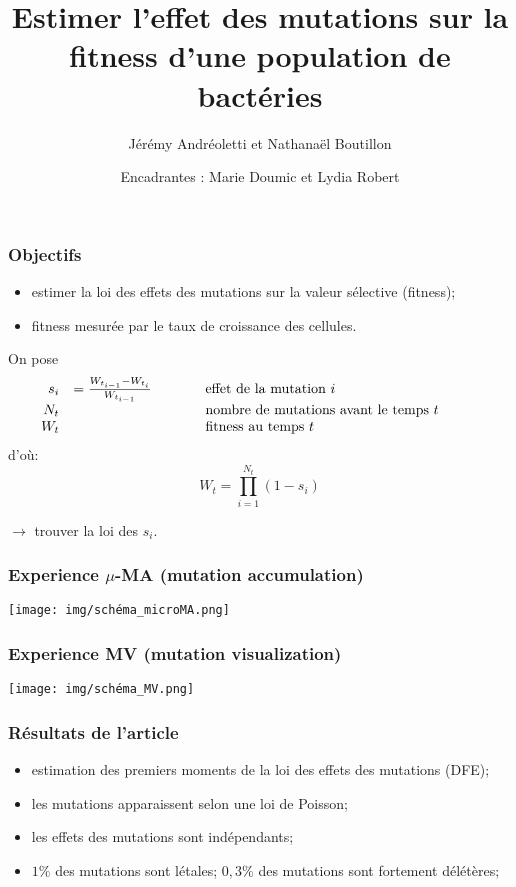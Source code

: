 \documentclass{beamer}
\title[Mutations]{Estimer l’effet des mutations sur la fitness d’une population de bactéries}
\date[2020-2021]{Encadrantes : Marie Doumic et Lydia Robert}
\author[J. Andréoletti, N. Boutillon]{Jérémy Andréoletti et Nathanaël Boutillon}
\newcommand{\comment}[1]{\hspace{1cm}\text{#1}\hspace{1cm}}
\begin{document}
\begin{frame}
  \titlepage
\end{frame}

\begin{frame}
  \frametitle{Objectifs}
  \begin{itemize}[label=\bullet]
  \item estimer la loi des effets des mutations sur la valeur sélective (fitness);
  \item fitness mesurée par le taux de croissance des cellules.
  \end{itemize}

  \pause\vspace{0.5cm}
  On pose
  \[
  \begin{array}{r l l}
    s_i&=\frac{W_{t_{i-1}}-W_{t_i}}{W_{t_{i-1}}}&\comment{effet de la mutation $i$}\\
    N_t &&\comment{nombre de mutations avant le temps $t$}\\
    W_t &&\comment{fitness au temps $t$}
  \end{array}
  \]
d'où:
\[W_t=\prod_{i=1}^{N_t}(1-s_i)\]

$\to$ trouver la loi des $s_i$.
\end{frame}

\begin{frame}
  \frametitle{Experience $\mu$-MA (mutation accumulation)}
  \center\texttt{[image: img/schéma\_microMA.png]}

\end{frame}
\begin{frame}
  \frametitle{Experience MV (mutation visualization)}
  \center\texttt{[image: img/schéma\_MV.png]}
  
\end{frame}

\begin{frame}
  \frametitle{Résultats de l'article}
  \begin{itemize}[label=\bullet]
  \item estimation des premiers moments de la loi des effets des mutations (DFE);
  \item les mutations apparaissent selon une loi de Poisson;
  \item les effets des mutations sont indépendants;
  \item $1\%$ des mutations sont létales; $0,3\%$ des mutations sont fortement délétères; 
  \end{itemize}
\end{frame}
\end{document}
